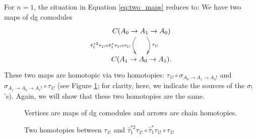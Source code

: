 For $n=1$, the situation in Equation 
\ref{eq:two_maps} reduces to: 
We have two maps of dg comodules
$$
\xymatrix{
C(A_0 \to A_1 \to A_0) 
 \ar@/^1pc/[d]^{\tau_{1!}}
 \ar@/_1pc/[d]_{\hat{\tau}_1^{*2} \tau_{1!}\circ
   \hat{\tau}_1^*\tau_{1!}\circ \tau_{1!}}\\
C(A_1 \to A_0 \to A_1).
}
$$
These two maps are homotopic via 
two homotopies: 
$\tau_{1!} \circ \sigma_{A_0 \to A_1 \to A_0!}$ 
and 
$\sigma_{A_1 \to A_0 \to A_1!} \circ \tau_{1!}$ 
(see Figure \ref{fig:two_homotopies_1}; 
for clarity, here, we indicate the sources 
of the $\sigma_!$'s). Again, we will 
show that these two homotopies are the same. 
%
\begin{figure}[H]
\xymatrixrowsep{4pc}
\centerline{}
\caption{Two homotopies between 
$\tau_{1!}$ and $\hat{\tau}_1^{*2} \tau_{1!}\circ
\hat{\tau}_1^*\tau_{1!}\circ \tau_{1!}$}
\label{fig:two_homotopies_1}
Vertices are maps of dg comodules and 
arrows are chain homotopies.
\end{figure}
